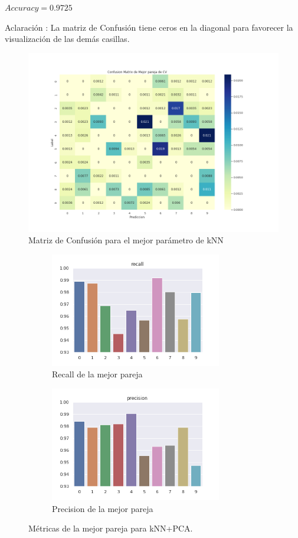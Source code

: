 \vspace{0.5cm}
$Accuracy = 0.9725 $
\par
\vspace{0.5cm}
Aclaración : La matriz de Confusión tiene ceros en la diagonal para favorecer la visualización de las demás casillas.

\begin{figure}[H]
    \centering
    \includegraphics[width=14cm]{images/ConfMatrix_knnpca.png}%
    \qquad
    \caption{Matriz de Confusión para el mejor parámetro de kNN }
    \label{knnpca_MatrizConf}%
\end{figure}

\begin{figure}[h]
\begin{subfigure}{0.5\textwidth}
\includegraphics[width=0.9\linewidth, height=5cm]{images/recall_knnpca.png} 
\caption{Recall de la mejor pareja}
\label{fig:metpca1}
\end{subfigure}
\begin{subfigure}{0.5\textwidth}
\includegraphics[width=0.9\linewidth, height=5cm]{images/precision_knnpca.png} 
\caption{Precision de la mejor pareja}
\label{fig:metpca2}
\end{subfigure}
\caption{Métricas de la mejor pareja para kNN+PCA.}
\label{knnpca_metricas}%
\end{figure}

